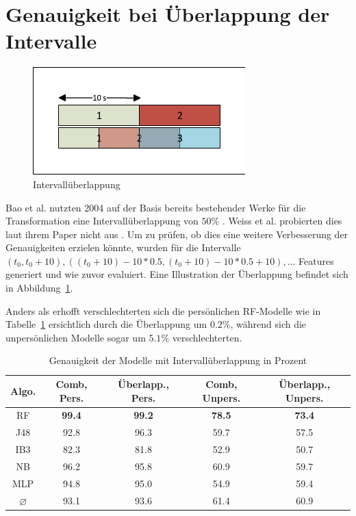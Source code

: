 \section{Genauigkeit bei Überlappung der Intervalle}
\begin{figure}[htb]
\centering
\includegraphics[clip=true, trim=5mm 5mm 5mm 5mm]{img/interval_overlap}
\caption{Intervallüberlappung}
\label{fig:interval-overlap}
\end{figure}

Bao et al. nutzten 2004 auf der Basis bereits bestehender Werke für die Transformation eine Intervallüberlappung von $50 \%$ \cite{Bao2004}. Weiss et al. probierten dies laut ihrem Paper nicht aus \cite{Weiss2016}. Um zu prüfen, ob dies eine weitere Verbesserung der Genauigkeiten erzielen könnte, wurden für die Intervalle $(t_0, t_0 + 10), ((t_0 + 10) - 10 * 0.5, (t_0 + 10) - 10 * 0.5 + 10), ...$ Features generiert und wie zuvor evaluiert. Eine Illustration der Überlappung befindet sich in Abbildung~\ref{fig:interval-overlap}.

Anders als erhofft verschlechterten sich die persönlichen RF-Modelle wie in Tabelle~\ref{tab:accuracy-overlap} ersichtlich durch die Überlappung um $0.2 \%$, während sich die unpersönlichen Modelle sogar um $5.1 \%$ verschlechterten.

\begin{table}
\centering
\begin{tabular}{|c|c|c||c|c|}
	\hline 
	\textbf{Algo.} & \textbf{Comb, Pers.} & \textbf{Überlapp., Pers.} &\textbf{Comb, Unpers.} & \textbf{Überlapp., Unpers.} \\ 
	\hline 
	RF & \textbf{99.4} & \textbf{99.2} & \textbf{78.5} & \textbf{73.4} \\ 
	J48 & 92.8 & 96.3 & 59.7 & 57.5 \\ 
	IB3 & 82.3 & 81.8 & 52.9 & 50.7 \\ 
	NB & 96.2 & 95.8 & 60.9 & 59.7 \\ 
	MLP & 94.8 & 95.0 & 54.9 & 59.4 \\ 
	\hline 
	$\varnothing$ & 93.1 & 93.6 & 61.4 & 60.9 \\ 
	\hline
\end{tabular} 
\caption{Genauigkeit der Modelle mit Intervallüberlappung in Prozent}
\label{tab:accuracy-overlap}
\end{table}

